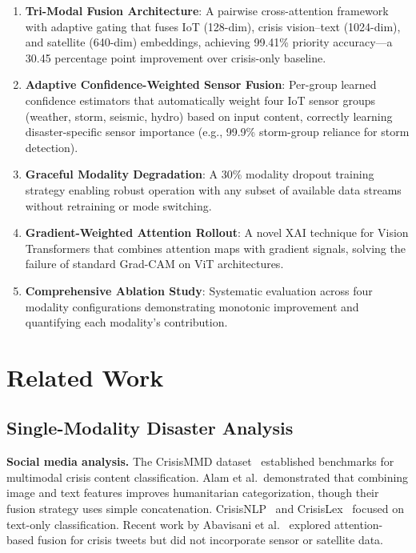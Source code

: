\documentclass[journal]{IEEEtran}
\begin{document}
\begin{enumerate}
    \item \textbf{Tri-Modal Fusion Architecture}: A pairwise cross-attention framework with adaptive gating that fuses IoT (128-dim), crisis vision--text (1024-dim), and satellite (640-dim) embeddings, achieving 99.41\% priority accuracy---a 30.45 percentage point improvement over crisis-only baseline.

    \item \textbf{Adaptive Confidence-Weighted Sensor Fusion}: Per-group learned confidence estimators that automatically weight four IoT sensor groups (weather, storm, seismic, hydro) based on input content, correctly learning disaster-specific sensor importance (e.g., 99.9\% storm-group reliance for storm detection).

    \item \textbf{Graceful Modality Degradation}: A 30\% modality dropout training strategy enabling robust operation with any subset of available data streams without retraining or mode switching.

    \item \textbf{Gradient-Weighted Attention Rollout}: A novel XAI technique for Vision Transformers that combines attention maps with gradient signals, solving the failure of standard Grad-CAM on ViT architectures.

    \item \textbf{Comprehensive Ablation Study}: Systematic evaluation across four modality configurations demonstrating monotonic improvement and quantifying each modality's contribution.
\end{enumerate}

\section{Related Work}

\subsection{Single-Modality Disaster Analysis}

\textbf{Social media analysis.} The CrisisMMD dataset~\cite{alam2018crisismmd} established benchmarks for multimodal crisis content classification. Alam et al.\ demonstrated that combining image and text features improves humanitarian categorization, though their fusion strategy uses simple concatenation. CrisisNLP~\cite{imran2015processing} and CrisisLex~\cite{olteanu2015crisislex} focused on text-only classification. Recent work by Abavisani et al.~\cite{abavisani2020multimodal} explored attention-based fusion for crisis tweets but did not incorporate sensor or satellite data.
\end{document}
